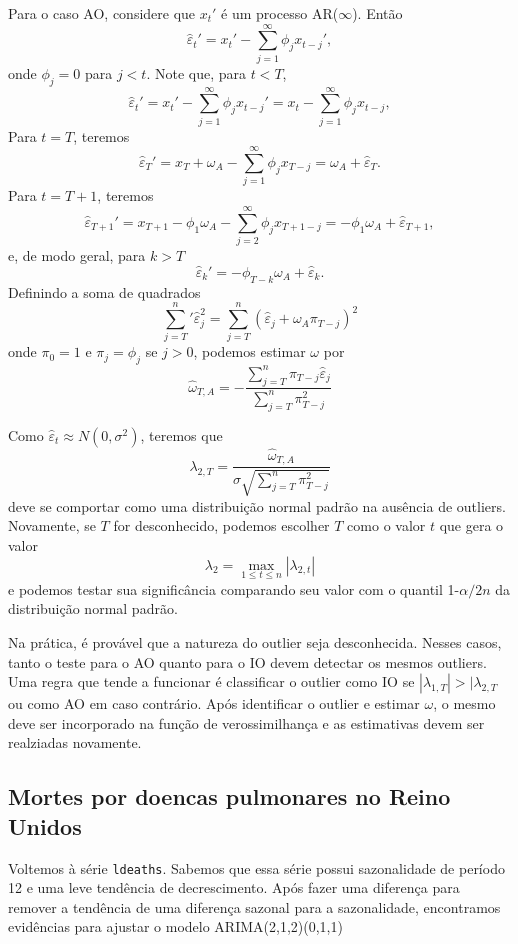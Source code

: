 \documentclass[
  letterpaper,
  DIV=11,
  numbers=noendperiod]{scrartcl}
\theoremstyle{plain}
\theoremstyle{plain}
\theoremstyle{definition}
\theoremstyle{definition}
\theoremstyle{remark}
\begin{document}
Para o caso AO, considere que \(x_t'\) é um processo AR(\(\infty\)).
Então \[\hat{\varepsilon}_t'=x_t'-\sum_{j=1}^\infty \phi_j x_{t-j}',\]
onde \(\phi_j=0\) para \(j<t\). Note que, para \(t<T\),
\[\hat{\varepsilon}_t'=x_t'-\sum_{j=1}^\infty \phi_j x_{t-j}'=x_t-\sum_{j=1}^\infty \phi_j x_{t-j},\]
Para \(t=T\), teremos
\[\hat{\varepsilon}_T'=x_T+\omega_A-\sum_{j=1}^\infty \phi_j x_{T-j}=\omega_A+\hat{\varepsilon}_T.\]
Para \(t=T+1\), teremos
\[\hat{\varepsilon}_{T+1}'=x_{T+1}-\phi_1\omega_A-\sum_{j=2}^\infty \phi_j x_{T+1-j}=-\phi_1\omega_A+\hat{\varepsilon}_{T+1},\]
e, de modo geral, para \(k>T\)
\[\hat{\varepsilon}_{k}'=-\phi_{T-k}\omega_A+\hat{\varepsilon}_k.\]
Definindo a soma de quadrados
\[\sum_{j=T}^n'\hat{\varepsilon}_j^2=\sum_{j=T}^{n}(\hat{\varepsilon}_{j}+\omega_A\pi_{T-j})^2\]
onde \(\pi_0=1\) e \(\pi_j=\phi_j\) se \(j>0\), podemos estimar
\(\omega\) por
\[\hat{\omega}_{T,A}=-\frac{\sum_{j=T}^n\pi_{T-j}\hat{\varepsilon}_{j}}{\sum_{j=T}^n\pi_{T-j}^2}\]

Como \(\hat{\varepsilon}_t\approx N(0,\sigma^2)\), teremos que
\[\lambda_{2,T}=\frac{\hat{\omega}_{T,A}}{\sigma\sqrt{\sum_{j=T}^n \pi_{T-j}^2}}\]
deve se comportar como uma distribuição normal padrão na ausência de
outliers. Novamente, se \(T\) for desconhecido, podemos escolher \(T\)
como o valor \(t\) que gera o valor
\[\lambda_2=\max_{1\leq t \leq n}|\lambda_{2,t}|\] e podemos testar sua
significância comparando seu valor com o quantil 1-\(\alpha/2n\) da
distribuição normal padrão.

Na prática, é provável que a natureza do outlier seja desconhecida.
Nesses casos, tanto o teste para o AO quanto para o IO devem detectar os
mesmos outliers. Uma regra que tende a funcionar é classificar o outlier
como IO se \(|\lambda_{1,T}|>|\lambda_{2,T}\) ou como AO em caso
contrário. Após identificar o outlier e estimar \(\omega\), o mesmo deve
ser incorporado na função de verossimilhança e as estimativas devem ser
realziadas novamente.

\hypertarget{mortes-por-doencas-pulmonares-no-reino-unidos}{%
\subsection{Mortes por doencas pulmonares no Reino
Unidos}\label{mortes-por-doencas-pulmonares-no-reino-unidos}}

Voltemos à série \texttt{ldeaths}. Sabemos que essa série possui
sazonalidade de período 12 e uma leve tendência de decrescimento. Após
fazer uma diferença para remover a tendência de uma diferença sazonal
para a sazonalidade, encontramos evidências para ajustar o modelo
ARIMA(2,1,2)(0,1,1)
\end{document}
